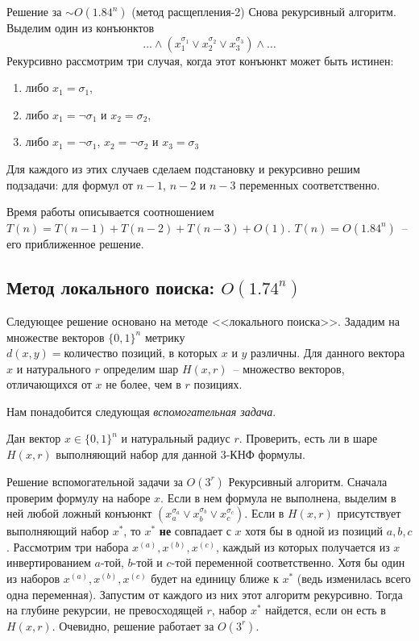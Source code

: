 \begin{algodescription}{Решение за $\sim O(1.84^n)$ (метод расщепления-2)}
    Снова рекурсивный алгоритм. Выделим один из конъюнктов $$\ldots\land(x_1^{\sigma_1} \lor x_2^{\sigma_2} \lor x_3^{\sigma_3})\land\ldots$$ Рекурсивно рассмотрим три случая, когда этот конъюнкт может быть истинен:
    \begin{enumerate}
    \item либо $x_1 = \sigma_1$,
    \item либо $x_1 = \neg\sigma_1$ и $x_2 = \sigma_2$,
    \item либо $x_1 = \neg\sigma_1$, $x_2 = \neg\sigma_2$ и $x_3 = \sigma_3$
    \end{enumerate}
    Для каждого из этих случаев сделаем подстановку и рекурсивно решим подзадачи: для формул от $n-1$, $n-2$ и $n-3$ переменных соответственно.
    
    Время работы описывается соотношением $T(n) = T(n-1) + T(n-2) + T(n-3) + O(1)$. $T(n) = O(1.84^n)$~-- его приближенное решение. 
\end{algodescription}

\subsection{Метод локального поиска: $O(1.74^n)$}
Следующее решение основано на методе <<локального поиска>>. Зададим на множестве векторов $\{0, 1\}^n$ метрику $d(x, y) = \text{количество позиций, в которых } x \text{ и } y \text{ различны}$. Для данного вектора $x$ и натурального $r$ определим шар $H(x, r)$~-- множество векторов, отличающихся от $x$ не более, чем в $r$ позициях.

Нам понадобится следующая \hypertarget{flip20}{\textit{вспомогательная задача}}.

\begin{problem*}
    Дан вектор $x \in \{0, 1\}^n$ и натуральный радиус $r$. Проверить, есть ли в шаре $H(x, r)$ выполняющий набор для данной 3-КНФ формулы.
\end{problem*}

\begin{algodescription}{Решение вспомогательной задачи за $O(3^r)$}
    Рекурсивный алгоритм. Сначала проверим формулу на наборе $x$. Если в нем формула не выполнена, выделим в ней любой ложный конъюнкт $(x_a^{\sigma_a} \lor x_b^{\sigma_b} \lor x_c^{\sigma_c})$. Если в $H(x, r)$ присутствует выполняющий набор $x^*$, то $x^*$ \textbf{не} совпадает с $x$ хотя бы в одной из позиций $a,b,c$. Рассмотрим три набора $x^{(a)}, x^{(b)}, x^{(c)}$, каждый из которых получается из $x$ инвертированием $a$-той, $b$-той и $c$-той переменной соответственно. Хотя бы один из наборов  $x^{(a)}, x^{(b)}, x^{(c)}$ будет на единицу ближе к $x^*$ (ведь изменилась всего одна переменная). Запустим от каждого из них этот алгоритм рекурсивно. Тогда на глубине рекурсии, не превосходящей $r$, набор $x^*$ найдется, если он есть в $H(x, r)$. Очевидно, решение работает за $O(3^r)$.
\end{algodescription}

